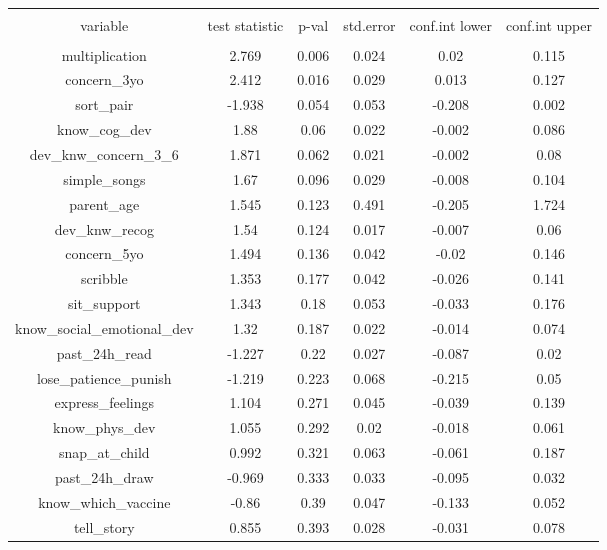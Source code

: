 
\begin{table}[!htbp] \centering 
  \caption{} 
  \label{tbl:treatment_baseline_imbalance_serbia} 
\begin{tabular}{@{\extracolsep{5pt}} cccccc} 
\\[-1.8ex]\hline 
\hline \\[-1.8ex] 
variable & test statistic & p-val & std.error & conf.int lower & conf.int upper \\ 
\hline \\[-1.8ex] 
multiplication & 2.769 & 0.006 & 0.024 & 0.02 & 0.115 \\ 
concern\_3yo & 2.412 & 0.016 & 0.029 & 0.013 & 0.127 \\ 
sort\_pair & -1.938 & 0.054 & 0.053 & -0.208 & 0.002 \\ 
know\_cog\_dev & 1.88 & 0.06 & 0.022 & -0.002 & 0.086 \\ 
dev\_knw\_concern\_3\_6 & 1.871 & 0.062 & 0.021 & -0.002 & 0.08 \\ 
simple\_songs & 1.67 & 0.096 & 0.029 & -0.008 & 0.104 \\ 
parent\_age & 1.545 & 0.123 & 0.491 & -0.205 & 1.724 \\ 
dev\_knw\_recog & 1.54 & 0.124 & 0.017 & -0.007 & 0.06 \\ 
concern\_5yo & 1.494 & 0.136 & 0.042 & -0.02 & 0.146 \\ 
scribble & 1.353 & 0.177 & 0.042 & -0.026 & 0.141 \\ 
sit\_support & 1.343 & 0.18 & 0.053 & -0.033 & 0.176 \\ 
know\_social\_emotional\_dev & 1.32 & 0.187 & 0.022 & -0.014 & 0.074 \\ 
past\_24h\_read & -1.227 & 0.22 & 0.027 & -0.087 & 0.02 \\ 
lose\_patience\_punish & -1.219 & 0.223 & 0.068 & -0.215 & 0.05 \\ 
express\_feelings & 1.104 & 0.271 & 0.045 & -0.039 & 0.139 \\ 
know\_phys\_dev & 1.055 & 0.292 & 0.02 & -0.018 & 0.061 \\ 
snap\_at\_child & 0.992 & 0.321 & 0.063 & -0.061 & 0.187 \\ 
past\_24h\_draw & -0.969 & 0.333 & 0.033 & -0.095 & 0.032 \\ 
know\_which\_vaccine & -0.86 & 0.39 & 0.047 & -0.133 & 0.052 \\ 
tell\_story & 0.855 & 0.393 & 0.028 & -0.031 & 0.078 \\ 

\end{tabular}
\end{table}
